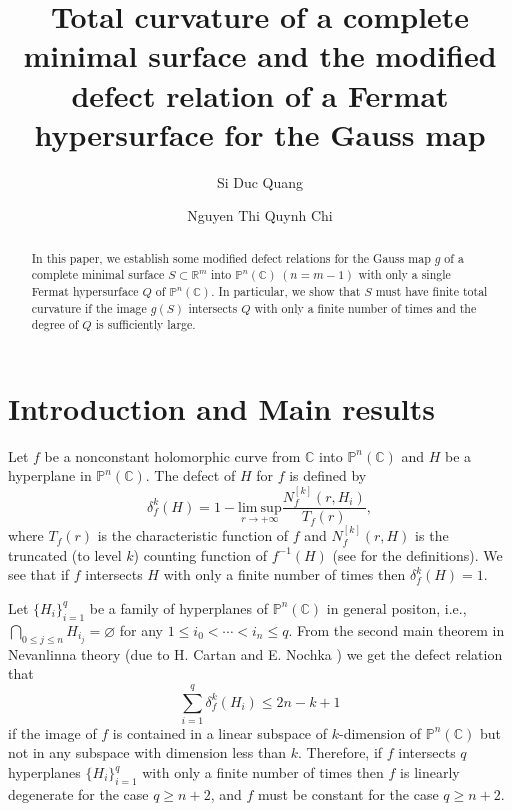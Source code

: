 \documentclass[12pt,article]{amsart}
\title[Total curvature of a complete minimal surface]{Total curvature of a complete minimal surface and the modified defect relation of a Fermat hypersurface for the Gauss map}
\author{Si Duc Quang}
\author{Nguyen Thi Quynh Chi}
\newcommand{\C}{{\mathbb{C}}}
\renewcommand{\P}{{\mathbb{P}}}
\numberwithin{equation}{section}
\begin{document}
\begin{abstract}
In this paper, we establish some modified defect relations for the Gauss map $g$ of a complete minimal surface $S\subset\mathbb R^m$ into $\mathbb P^n(\mathbb C)\ (n=m-1)$ with only a single Fermat hypersurface $Q$ of $\mathbb P^n(\mathbb C)$.  In particular, we show that $S$ must have finite total curvature if the image $g(S)$ intersects $Q$ with only a finite number of times and the degree of $Q$ is sufficiently large.
\end{abstract}

\maketitle

\def\thefootnote{\empty}


\section{Introduction and Main results} 

Let $f$ be a nonconstant holomorphic curve from $\C$ into $\P^n(\C)$ and $H$ be a hyperplane in $\P^n(\C)$. The defect of $H$ for $f$ is defined by 
$$\delta^k_f(H)=1-\underset{r\longrightarrow +\infty}{\mathrm{lim\ sup}}\frac{N^{[k]}_f(r,H_i)}{T_f(r)},$$  
where $T_f(r)$ is the characteristic function of $f$ and $N^{[k]}_f(r,H)$ is the truncated (to level $k$) counting function of $f^{-1}(H)$ (see \cite{NO} for the definitions). We see that if $f$ intersects $H$ with only a finite number of times then $\delta^k_f(H)=1$.

Let $\{H_i\}_{i=1}^q$ be a family of hyperplanes of $\P^n(\C)$ in general positon, i.e., $\bigcap_{0\le j\le n}H_{i_j}=\varnothing$ for any $1\le i_0<\cdots<i_n\le q$. From the second main theorem in Nevanlinna theory (due to H. Cartan \cite{Ca} and E. Nochka \cite{Noc83}) we get the defect relation that 
$$\sum_{i=1}^q\delta^k_f(H_i)\le 2n-k+1$$ 
if the image of $f$ is contained in a linear subspace of $k$-dimension of $\P^n(\C)$ but not in any subspace with dimension less than $k$. 
 Therefore, if $f$ intersects $q$ hyperplanes $\{H_i\}_{i=1}^q$ with only a finite number of times then $f$ is linearly degenerate for the case $q\ge n+2$, and $f$ must be constant for the case $q\ge n+2.$
\end{document}
